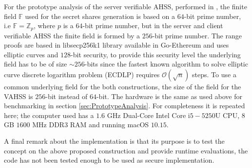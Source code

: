  For the prototype analysis of the server verifiable AHSS, performed in \cite{VAHSS}, the finite field $\mathds{F}$ used for the secret shares generation is based on a $64$-bit prime number, i.e $\mathds{F}=\mathds{Z}_p$, where $p$ is a $64$-bit prime number,  but in the server and client verifiable AHSS the finite field is formed by a $256$-bit prime number.  The range proofs are based in libsecp256k1 library available in Go-Ethereum and uses elliptic curves and $128$-bit security, to provide this security level the underlying field has to be of size $\sim 256$-bits since the fastest known algorithm to solve elliptic curve discrete logarithm problem (ECDLP) requires $\mathcal{O}(\sqrt{n})$ steps. To use a common underlying field  for the both constructions,  the size of the field for the VAHSS is $256$-bit instead of $64$-bit. The hardware is the same as used above for benchmarking in section \ref{sec:PrototypeAnalysis}. For completeness it is repeated here; the computer used has a $1.6$ GHz Dual-Core Intel Core i$5-5250$U CPU, $8$GB $1600$ MHz DDR3 RAM  and running macOS $10.15$. 





A final remark about the implementation is that its purpose is to test the concept on the above proposed construction and provide runtime evaluations, the code has not been tested enough to be used as secure implementation.




